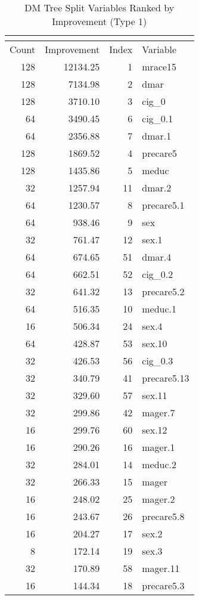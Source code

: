 \begingroup\small\setlength{\tabcolsep}{0.6em}\renewcommand{\arraystretch}{0.9}
\begin{longtable}{rrrp{3cm}}
\caption{DM Tree Split Variables Ranked by Improvement (Type 1)}\\
\label{tab:splits_type1_multipage}\\
\hline
Count & Improvement & Index & Variable \\ \hline
\endhead
128 & 12134.25 & 1 & mrace15 \\
128 & 7134.98 & 2 & dmar \\
128 & 3710.10 & 3 & cig_0 \\
64 & 3490.45 & 6 & cig_0.1 \\
64 & 2356.88 & 7 & dmar.1 \\
128 & 1869.52 & 4 & precare5 \\
128 & 1435.86 & 5 & meduc \\
32 & 1257.94 & 11 & dmar.2 \\
64 & 1230.57 & 8 & precare5.1 \\
64 & 938.46 & 9 & sex \\
32 & 761.47 & 12 & sex.1 \\
64 & 674.65 & 51 & dmar.4 \\
64 & 662.51 & 52 & cig_0.2 \\
32 & 641.32 & 13 & precare5.2 \\
64 & 516.35 & 10 & meduc.1 \\
16 & 506.34 & 24 & sex.4 \\
64 & 428.87 & 53 & sex.10 \\
32 & 426.53 & 56 & cig_0.3 \\
32 & 340.79 & 41 & precare5.13 \\
32 & 329.60 & 57 & sex.11 \\
32 & 299.86 & 42 & mager.7 \\
16 & 299.76 & 60 & sex.12 \\
16 & 290.26 & 16 & mager.1 \\
32 & 284.01 & 14 & meduc.2 \\
32 & 266.33 & 15 & mager \\
16 & 248.02 & 25 & mager.2 \\
16 & 243.67 & 26 & precare5.8 \\
16 & 204.27 & 17 & sex.2 \\
8 & 172.14 & 19 & sex.3 \\
32 & 170.89 & 58 & mager.11 \\
16 & 144.34 & 18 & precare5.3 \\

\end{longtable}
